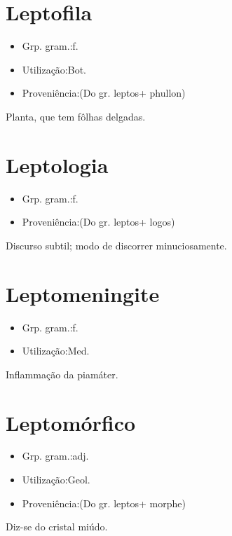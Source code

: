 \section{Leptofila}
\begin{itemize}
\item {Grp. gram.:f.}
\end{itemize}
\begin{itemize}
\item {Utilização:Bot.}
\end{itemize}
\begin{itemize}
\item {Proveniência:(Do gr. \textunderscore leptos\textunderscore  + \textunderscore phullon\textunderscore )}
\end{itemize}
Planta, que tem fôlhas delgadas.
\section{Leptologia}
\begin{itemize}
\item {Grp. gram.:f.}
\end{itemize}
\begin{itemize}
\item {Proveniência:(Do gr. \textunderscore leptos\textunderscore  + \textunderscore logos\textunderscore )}
\end{itemize}
Discurso subtil; modo de discorrer minuciosamente.
\section{Leptomeningite}
\begin{itemize}
\item {Grp. gram.:f.}
\end{itemize}
\begin{itemize}
\item {Utilização:Med.}
\end{itemize}
Inflammação da piamáter.
\section{Leptomórfico}
\begin{itemize}
\item {Grp. gram.:adj.}
\end{itemize}
\begin{itemize}
\item {Utilização:Geol.}
\end{itemize}
\begin{itemize}
\item {Proveniência:(Do gr. \textunderscore leptos\textunderscore  + \textunderscore morphe\textunderscore )}
\end{itemize}
Diz-se do cristal miúdo.
